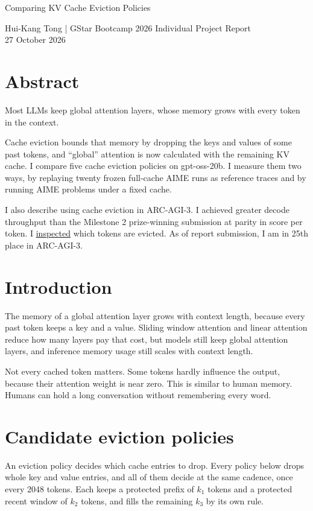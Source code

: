 \documentclass[10pt,letterpaper]{article}
\begin{document}
\begin{center}
{\LARGE Comparing KV Cache Eviction Policies\par}
\vspace{8pt}
Hui-Kang Tong | GStar Bootcamp 2026 Individual Project Report\\
27 October 2026
\end{center}

\section*{Abstract}
Most LLMs keep global attention layers, whose memory grows with every token in the context.

Cache eviction bounds that memory by dropping the keys and values of some past tokens, and ``global'' attention is now calculated with the remaining KV cache.
I compare five cache eviction policies on gpt-oss-20b.
I measure them two ways, by replaying twenty frozen full-cache AIME runs as reference traces and by running AIME problems under a fixed cache.

I also describe using cache eviction in ARC-AGI-3.
I achieved greater decode throughput than the Milestone 2 prize-winning submission at parity in score per token.
I \href{https://tonghuikang.github.io/cache-eviction/arc-agi-3}{inspected} which tokens are evicted.
As of report submission, I am in 25th place in ARC-AGI-3.


\section{Introduction}

The memory of a global attention layer grows with context length, because every past token keeps a key and a value.
Sliding window attention and linear attention reduce how many layers pay that cost, but models still keep global attention layers, and inference memory usage still scales with context length.

Not every cached token matters.
Some tokens hardly influence the output, because their attention weight is near zero.
This is similar to human memory.
Humans can hold a long conversation without remembering every word.


\section{Candidate eviction policies}

An eviction policy decides which cache entries to drop.
Every policy below drops whole key and value entries, and all of them decide at the same cadence, once every 2048 tokens.
Each keeps a protected prefix of $k_1$ tokens and a protected recent window of $k_2$ tokens, and fills the remaining $k_3$ by its own rule.
\end{document}
